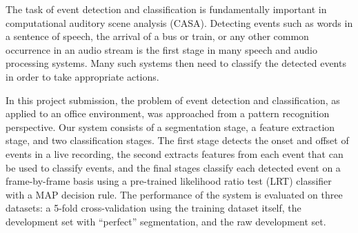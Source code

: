 The task of event detection and classification is fundamentally important in computational auditory scene analysis (CASA). Detecting events such as words in a sentence of speech, the arrival of a bus or train, or any other common occurrence in an audio stream is the first stage in many speech and audio processing systems. Many such systems then need to classify the detected events in order to take appropriate actions.

In this project submission, the problem of event detection and classification, as applied to an office environment, was approached from a pattern recognition perspective. Our system consists of a segmentation stage, a feature extraction stage, and two classification stages. The first stage detects the onset and offset of events in a live recording, the second extracts features from each event that can be used to classify events, and the final stages classify each detected event
on a frame-by-frame basis using a pre-trained likelihood ratio test (LRT) classifier with a MAP decision rule. The performance of the system is evaluated on three datasets: a 5-fold cross-validation using the training dataset itself, the development set with ``perfect'' segmentation, and the raw development set.
